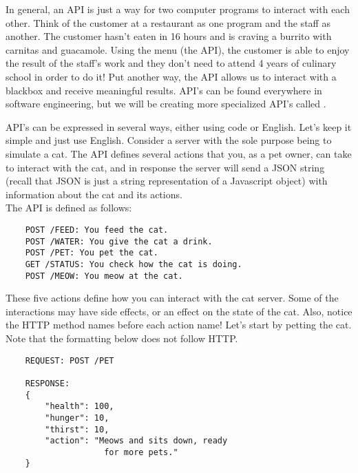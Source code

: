 In general, an API is just a way for two computer programs to interact with each other. Think of the customer at a restaurant as one program and the staff as another. The customer hasn't eaten in 16 hours and is craving a burrito with carnitas and guacamole. Using the menu (the API), the customer is able to enjoy the result of the staff's work and they don't need to attend 4 years of culinary school in order to do it! Put another way, the API allows us to interact with a blackbox and receive meaningful results. API's can be found everywhere in software engineering, but we will be creating more specialized API's called .

\begin{kaobox}[title=Let's take a look at an example of a simple API.]
    
    API's can be expressed in several ways, either using code or English. Let's keep it simple and just use English. Consider a server with the sole purpose being to simulate a cat. The API defines several actions that you, as a pet owner, can take to interact with the cat, and in response the server will send a JSON string (recall that JSON is just a string representation of a Javascript object) with information about the cat and its actions. \\

    The API is defined as follows:
    \begin{verbatim}
    POST /FEED: You feed the cat.
    POST /WATER: You give the cat a drink.
    POST /PET: You pet the cat.
    GET /STATUS: You check how the cat is doing.
    POST /MEOW: You meow at the cat.
    \end{verbatim}

    These five actions define how you can interact with the cat server. Some of the interactions may have side effects, or an effect on the state of the cat. Also, notice the HTTP method names before each action name! Let's start by petting the cat. Note that the formatting below does not follow HTTP.

    \begin{verbatim}
    REQUEST: POST /PET

    RESPONSE: 
    {
        "health": 100,
        "hunger": 10,
        "thirst": 10,
        "action": "Meows and sits down, ready 
                    for more pets."
    }
    \end{verbatim}


\end{kaobox}
